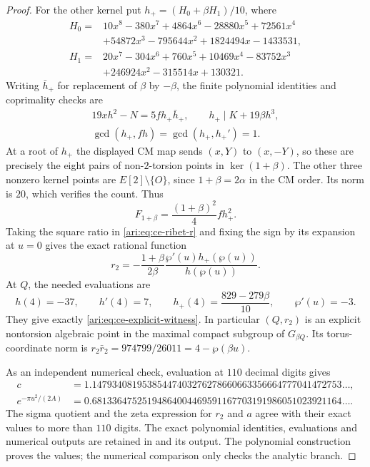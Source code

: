 \begin{proof}
For the other kernel put $h_+=(H_0+\beta H_1)/10$, where
\[
 \begin{aligned}
 H_0={}&10x^8-380x^7+4864x^6-28880x^5+72561x^4\\
       &+54872x^3-795644x^2+1824494x-1433531,\\
 H_1={}&20x^7-304x^6+760x^5+10469x^4-83752x^3\\
       &+246924x^2-315514x+130321.
 \end{aligned}
\]
Writing $\bar h_+$ for replacement of $\beta$ by $-\beta$,
the finite polynomial identities and coprimality checks are
\[
 \begin{gathered}
 19xh^2-N=5f h_+\bar h_+,\qquad
 h_+\mid K+19\beta h^3,\\
 \gcd(h_+,fh)=\gcd(h_+,h_+')=1.
 \end{gathered}
\]
At a root of $h_+$ the displayed CM map sends $(x,Y)$ to
$(x,-Y)$, so these are precisely the eight pairs of
non-$2$-torsion points in $\ker(1+\beta)$. The other three
nonzero kernel points are $E[2]\setminus\{O\}$, since
$1+\beta=2\alpha$ in the CM order. Its norm is $20$,
which verifies the count. Thus
\[
 F_{1+\beta}=\frac{(1+\beta)^2}{4}f h_+^2.
\]
Taking the square ratio in \eqref{ari:eq:ce-ribet-r} and fixing
the sign by its expansion at $u=0$ gives the exact rational
function
\[
 r_2=-\frac{1+\beta}{2\beta}\frac{\wp'(u)h_+(\wp(u))}
                                             {h(\wp(u))}.
\]
At $Q$, the needed evaluations are
\[
 h(4)=-37,\qquad h'(4)=7,\qquad
 h_+(4)=\frac{829-279\beta}{10},\qquad\wp'(u)=-3.
\]
They give exactly \eqref{ari:eq:ce-explicit-witness}. In
particular $(Q,r_2)$ is an explicit nontorsion algebraic
point in the maximal compact subgroup of $G_{\beta Q}$.
Its torus-coordinate norm is
$r_2\bar r_2=974799/26011=4-\wp(\beta u)$.

As an independent numerical check, evaluation at $110$
decimal digits gives
\[
 \begin{aligned}
 c&=1.14793408195385447403276278660663356664777041472753\ldots,\\
 e^{-\pi u^2/(2A)}
  &=0.68133647525194864004469591167703191986051023921164\ldots.
 \end{aligned}
\]
The sigma quotient and the zeta expression for $r_2$ and $a$
agree with their exact values to more than $110$ digits.
The exact polynomial identities, evaluations and numerical
outputs are retained in  and
its output. The polynomial construction proves the values;
the numerical comparison only checks the analytic branch.
\end{proof}

